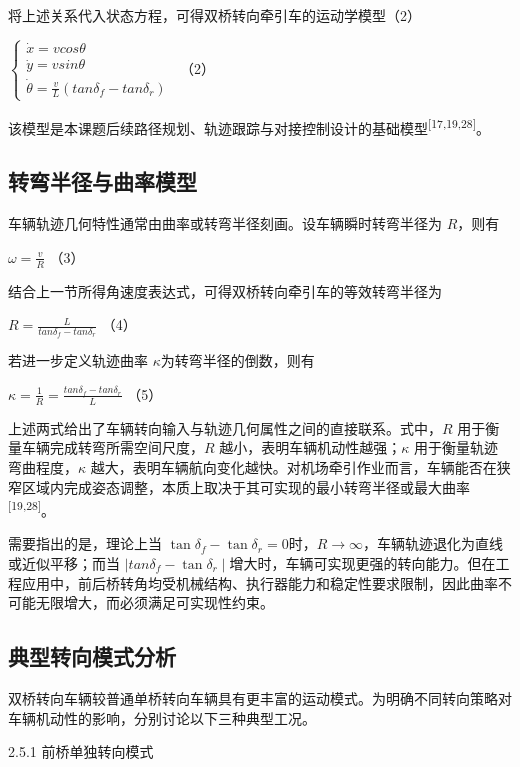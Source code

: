 将上述关系代入状态方程，可得双桥转向牵引车的运动学模型（2）

\(\left\{ \begin{array}{r}
\dot{x} = vcos\theta \\
\dot{y} = vsin\theta \\
\dot{\theta} = \frac{v}{L}\left( tan\delta_{f} - tan\delta_{r} \right)
\end{array} \right.\ \) （2）

该模型是本课题后续路径规划、轨迹跟踪与对接控制设计的基础模型\textsuperscript{[17,19,28]}。

\subsection{转弯半径与曲率模型}

车辆轨迹几何特性通常由曲率或转弯半径刻画。设车辆瞬时转弯半径为
\(R\)，则有

\(\omega = \frac{v}{R}\) （3）

结合上一节所得角速度表达式，可得双桥转向牵引车的等效转弯半径为

\(R = \frac{L}{tan\delta_{f} - tan\delta_{r}}\) （4）

若进一步定义轨迹曲率 \(\kappa\)为转弯半径的倒数，则有

\(\kappa = \frac{1}{R} = \frac{tan\delta_{f} - tan\delta_{r}}{L}\) （5）

上述两式给出了车辆转向输入与轨迹几何属性之间的直接联系。式中，\(R\)
用于衡量车辆完成转弯所需空间尺度，\(R\)
越小，表明车辆机动性越强；\(\kappa\) 用于衡量轨迹弯曲程度，\(\kappa\)
越大，表明车辆航向变化越快。对机场牵引作业而言，车辆能否在狭窄区域内完成姿态调整，本质上取决于其可实现的最小转弯半径或最大曲率\textsuperscript{[19,28]}。

需要指出的是，理论上当
\(\tan\delta_{f} - \tan\delta_{r} = 0\)时，\(R \rightarrow \infty\)，车辆轨迹退化为直线或近似平移；而当
\(\mid tan\delta_{f} - \tan\delta_{r} \mid\)增大时，车辆可实现更强的转向能力。但在工程应用中，前后桥转角均受机械结构、执行器能力和稳定性要求限制，因此曲率不可能无限增大，而必须满足可实现性约束。

\subsection{典型转向模式分析}

双桥转向车辆较普通单桥转向车辆具有更丰富的运动模式。为明确不同转向策略对车辆机动性的影响，分别讨论以下三种典型工况。

2.5.1 前桥单独转向模式

